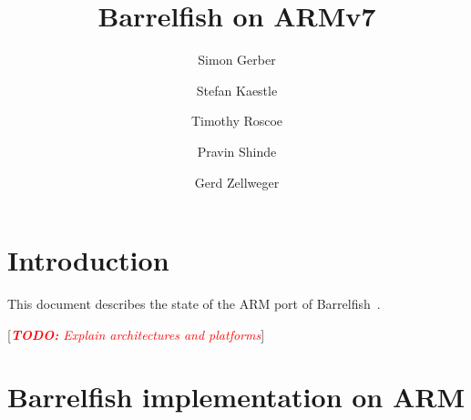 \documentclass[a4paper,twoside]{report} %
\title{Barrelfish on ARMv7}   %
\author{Simon Gerber \and Stefan Kaestle \and Timothy Roscoe \and
  Pravin Shinde \and Gerd Zellweger}
\newcommand{\todo}[1]{\note{\textbf{TODO:} #1}}
\begin{document}
\maketitle

\newcommand{\code}[1]{{\lstinline!#1!}}
\newcommand{\file}[1]{{\lstinline!#1!}}

\lstset{%
  basicstyle=\small\ttfamily,
  escapechar=@
}

\newcommand{\shell}{\$}
\newcommand{\home}{\$HOME}

\newcommand{\stefan}[1]{%
  {\color{red}[{\color{red}{SK}} #1]}}

\newcommand{\gerd}[1]{%
  {\color{red}[{\color{red}{GZ}} #1]}}

\newcommand{\simon}[1]{%
  {\color{red}[{\color{red}{SG}} #1]}}

\newcommand{\pravin}[1]{%
  {\color{red}[{\color{red}{PS}} #1]}}


%
%
\begin{versionhistory}
\end{versionhistory}

\tableofcontents		%


\newcommand{\eclipse}{ECL\textsuperscript{i}PS\textsuperscript{e}\xspace}
\newcommand{\codesize}{\scriptsize}
\newcommand{\note}[1]{[\textcolor{red}{\emph{#1}}]}

\chapter{Introduction}

This document describes the state of the ARM port of
Barrelfish~\cite{barrelfish:sosp09}.

\todo{Explain architectures and platforms}

\chapter{Barrelfish implementation on ARM}\label{chap:impl}
\end{document}
